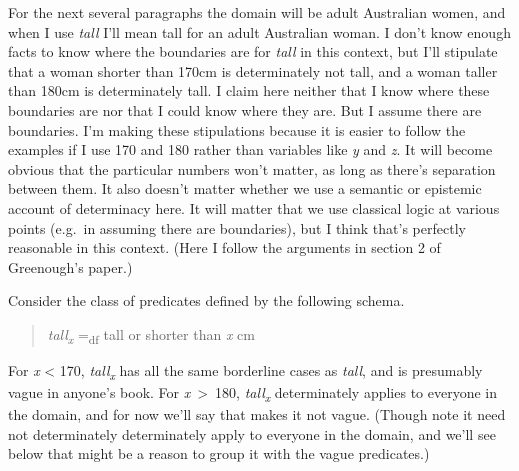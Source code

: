 \documentclass[
  11pt,
  letterpaper,
  DIV=11,
  numbers=noendperiod,
  twoside]{scrartcl}
\begin{document}
For the next several paragraphs the domain will be adult Australian
women, and when I use \emph{tall} I'll mean tall for an adult Australian
woman. I don't know enough facts to know where the boundaries are for
\emph{tall} in this context, but I'll stipulate that a woman shorter
than 170cm is determinately not tall, and a woman taller than 180cm is
determinately tall. I claim here neither that I know where these
boundaries are nor that I could know where they are. But I assume there
are boundaries. I'm making these stipulations because it is easier to
follow the examples if I use 170 and 180 rather than variables like
\emph{y} and \emph{z}. It will become obvious that the particular
numbers won't matter, as long as there's separation between them. It
also doesn't matter whether we use a semantic or epistemic account of
determinacy here. It will matter that we use classical logic at various
points (e.g.~in assuming there are boundaries), but I think that's
perfectly reasonable in this context. (Here I follow the arguments in
section 2 of Greenough's paper.)

Consider the class of predicates defined by the following schema.

\begin{quote}
\emph{tall\textsubscript{x}} =\textsubscript{df} tall or shorter than
\emph{x} cm
\end{quote}

For \emph{x} \textless{} 170, \emph{tall\textsubscript{x}} has all the
same borderline cases as \emph{tall}, and is presumably vague in
anyone's book. For \emph{x}~\textgreater~180,
\emph{tall\textsubscript{x}} determinately applies to everyone in the
domain, and for now we'll say that makes it not vague. (Though note it
need not determinately determinately apply to everyone in the domain,
and we'll see below that might be a reason to group it with the vague
predicates.)
\end{document}
